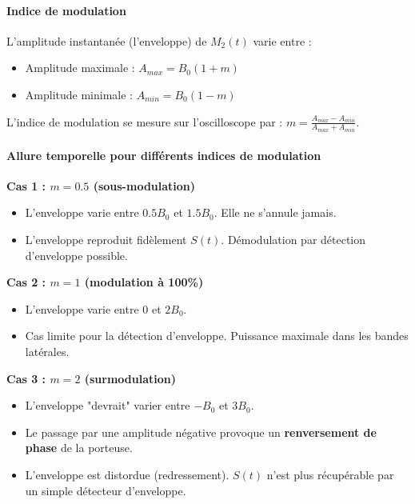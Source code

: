 \documentclass[11pt,a4paper]{article}
\begin{document}
\paragraph{Indice de modulation}
L'amplitude instantanée (l'enveloppe) de $M_2(t)$ varie entre :
\begin{itemize}
    \item Amplitude maximale : $A_{max} = B_0(1 + m)$
    \item Amplitude minimale : $A_{min} = B_0(1 - m)$
\end{itemize}
L'indice de modulation se mesure sur l'oscilloscope par :
$m = \frac{A_{max} - A_{min}}{A_{max} + A_{min}}$.

\paragraph{Allure temporelle pour différents indices de modulation}

\textbf{Cas 1 : $m = 0.5$ (sous-modulation)}
\begin{itemize}
    \item L'enveloppe varie entre $0.5 B_0$ et $1.5 B_0$. Elle ne s'annule jamais.
    \item L'enveloppe reproduit fidèlement $S(t)$. Démodulation par détection d'enveloppe possible.
\end{itemize}

\textbf{Cas 2 : $m = 1$ (modulation à 100\%)}
\begin{itemize}
    \item L'enveloppe varie entre $0$ et $2 B_0$.
    \item Cas limite pour la détection d'enveloppe. Puissance maximale dans les bandes latérales.
\end{itemize}

\textbf{Cas 3 : $m = 2$ (surmodulation)}
\begin{itemize}
    \item L'enveloppe "devrait" varier entre $-B_0$ et $3 B_0$.
    \item Le passage par une amplitude négative provoque un \textbf{renversement de phase} de la porteuse.
    \item L'enveloppe est distordue (redressement). $S(t)$ n'est plus récupérable par un simple détecteur d'enveloppe.
\end{itemize}
\end{document}
